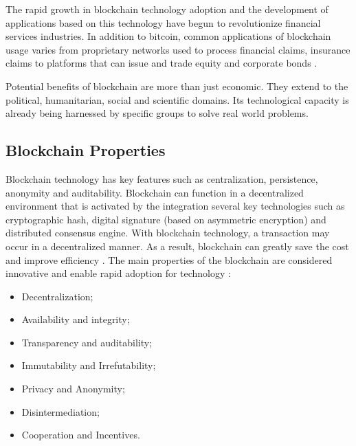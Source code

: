 The rapid growth in blockchain technology adoption and the development of applications based on this technology have begun to revolutionize financial services industries. In addition to bitcoin, common applications of blockchain usage varies from proprietary networks used to process financial claims, insurance claims to platforms that can issue and trade equity and corporate bonds \cite{michael2018blockchain}.

Potential benefits of blockchain are more than just economic. They extend to the political, humanitarian, social and scientific domains. Its technological capacity is already being harnessed by specific groups to solve real world problems.

\subsection{Blockchain Properties}\label{sec:propriedades}

Blockchain technology has key features such as centralization, persistence, anonymity and auditability. Blockchain can function in a decentralized environment that is activated by the integration several key technologies such as cryptographic hash, digital signature (based on asymmetric encryption) and distributed consensus engine. With blockchain technology, a transaction may occur in a decentralized manner. As a result, blockchain can greatly save the cost and improve efficiency \cite{zheng2016blockchain}. The main properties of the blockchain are considered innovative and enable rapid adoption for technology \cite{greve2018blockchain}:

\begin{itemize}
\item Decentralization;
\item Availability and integrity;
\item Transparency and auditability;
\item Immutability and Irrefutability;
\item Privacy and Anonymity;
\item Disintermediation;
\item Cooperation and Incentives.
\end{itemize}